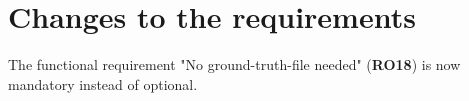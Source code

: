 \section{Changes to the requirements}

The functional requirement "No \gls{ground-truth-file} needed" (\textbf{RO18}) is now mandatory instead of optional.